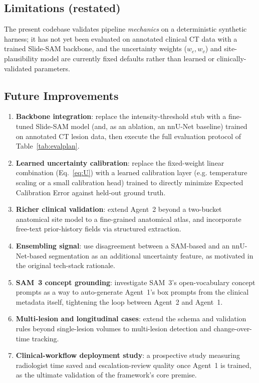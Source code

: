 \documentclass[11pt,a4paper]{article}
\begin{document}
\subsection{Limitations (restated)}
The present codebase validates pipeline \emph{mechanics} on a deterministic synthetic harness; it has not yet been evaluated on annotated clinical CT data with a trained Slide-SAM backbone, and the uncertainty weights ($w_c, w_v$) and site-plausibility model are currently fixed defaults rather than learned or clinically-validated parameters.

\subsection{Future Improvements}
\begin{enumerate}[leftmargin=1.4em]
    \item \textbf{Backbone integration}: replace the intensity-threshold stub with a fine-tuned Slide-SAM model (and, as an ablation, an nnU-Net baseline) trained on annotated CT lesion data, then execute the full evaluation protocol of Table~\ref{tab:evalplan}.
    \item \textbf{Learned uncertainty calibration}: replace the fixed-weight linear combination (Eq.~\ref{eq:U}) with a learned calibration layer (e.g. temperature scaling or a small calibration head) trained to directly minimize Expected Calibration Error against held-out ground truth.
    \item \textbf{Richer clinical validation}: extend Agent~2 beyond a two-bucket anatomical site model to a fine-grained anatomical atlas, and incorporate free-text prior-history fields via structured extraction.
    \item \textbf{Ensembling signal}: use disagreement between a SAM-based and an nnU-Net-based segmentation as an additional uncertainty feature, as motivated in the original tech-stack rationale.
    \item \textbf{SAM~3 concept grounding}: investigate SAM~3's open-vocabulary concept prompts \cite{sam3} as a way to auto-generate Agent~1's box prompts from the clinical metadata itself, tightening the loop between Agent~2 and Agent~1.
    \item \textbf{Multi-lesion and longitudinal cases}: extend the schema and validation rules beyond single-lesion volumes to multi-lesion detection and change-over-time tracking.
    \item \textbf{Clinical-workflow deployment study}: a prospective study measuring radiologist time saved and escalation-review quality once Agent~1 is trained, as the ultimate validation of the framework's core premise.
\end{enumerate}
\end{document}
